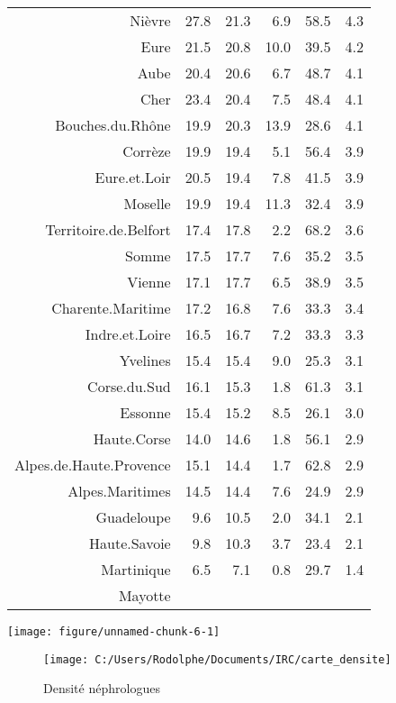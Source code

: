 \documentclass[11pt,a4paper]{article}\usepackage[]{graphicx}\usepackage[]{color}
\makeatletter
\def\maxwidth{ %
  \ifdim\Gin@nat@width>\linewidth
    \linewidth
  \else
    \Gin@nat@width
  \fi
}
\newenvironment{knitrout}{}{} %
\makeatother
\begin{document}
\begin{table}[H]
\begin{tabular}{rrrrrr}
  Nièvre & 27.8 & 21.3 & 6.9 & 58.5 & 4.3 \\ 
  Eure & 21.5 & 20.8 & 10.0 & 39.5 & 4.2 \\ 
  Aube & 20.4 & 20.6 & 6.7 & 48.7 & 4.1 \\ 
  Cher & 23.4 & 20.4 & 7.5 & 48.4 & 4.1 \\ 
  Bouches.du.Rhône & 19.9 & 20.3 & 13.9 & 28.6 & 4.1 \\ 
  Corrèze & 19.9 & 19.4 & 5.1 & 56.4 & 3.9 \\ 
  Eure.et.Loir & 20.5 & 19.4 & 7.8 & 41.5 & 3.9 \\ 
  Moselle & 19.9 & 19.4 & 11.3 & 32.4 & 3.9 \\ 
  Territoire.de.Belfort & 17.4 & 17.8 & 2.2 & 68.2 & 3.6 \\ 
  Somme & 17.5 & 17.7 & 7.6 & 35.2 & 3.5 \\ 
  Vienne & 17.1 & 17.7 & 6.5 & 38.9 & 3.5 \\ 
  Charente.Maritime & 17.2 & 16.8 & 7.6 & 33.3 & 3.4 \\ 
  Indre.et.Loire & 16.5 & 16.7 & 7.2 & 33.3 & 3.3 \\ 
  Yvelines & 15.4 & 15.4 & 9.0 & 25.3 & 3.1 \\ 
  Corse.du.Sud & 16.1 & 15.3 & 1.8 & 61.3 & 3.1 \\ 
  Essonne & 15.4 & 15.2 & 8.5 & 26.1 & 3.0 \\ 
  Haute.Corse & 14.0 & 14.6 & 1.8 & 56.1 & 2.9 \\ 
  Alpes.de.Haute.Provence & 15.1 & 14.4 & 1.7 & 62.8 & 2.9 \\ 
  Alpes.Maritimes & 14.5 & 14.4 & 7.6 & 24.9 & 2.9 \\ 
  Guadeloupe & 9.6 & 10.5 & 2.0 & 34.1 & 2.1 \\ 
  Haute.Savoie & 9.8 & 10.3 & 3.7 & 23.4 & 2.1 \\ 
  Martinique & 6.5 & 7.1 & 0.8 & 29.7 & 1.4 \\ 
  Mayotte &  &  &  &  &  \\ 
   \hline
\end{tabular}
\end{table}



\begin{knitrout}
\color{fgcolor}
\texttt{[image: figure/unnamed-chunk-6-1]} 

\end{knitrout}

\begin{figure}[H]
	\centering
	\texttt{[image: C:/Users/Rodolphe/Documents/IRC/carte\_densite]}
	\caption{Densité néphrologues}
	\label{fig:cartedensite}
\end{figure}
\end{document}
